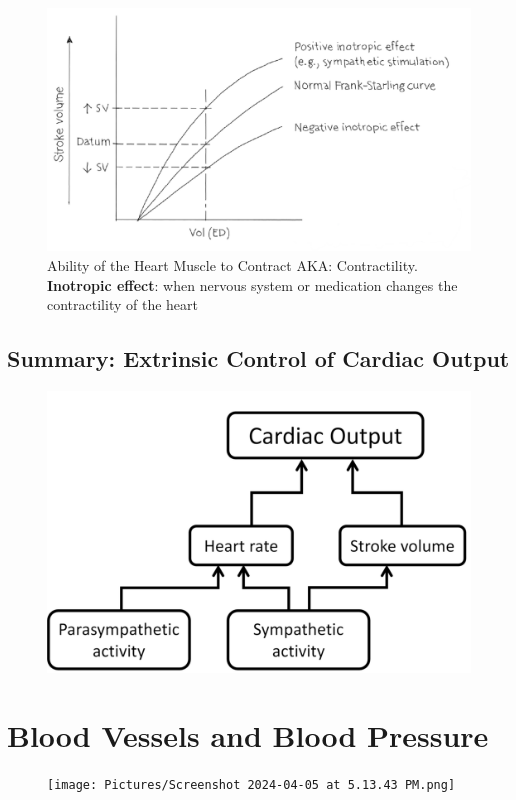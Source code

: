 \documentclass[11pt,fleqn]{book}
\begin{document}
\begin{figure}[h!]
\begin{center}
    \includegraphics[width=0.6\linewidth]{Pictures/Screenshot 2024-04-04 012911.png}
\end{center}
    \caption{Ability of the Heart Muscle to Contract
AKA: Contractility. \textbf{Inotropic effect}: when nervous
system or medication changes
the contractility of the heart
}
\end{figure}

\newpage
\subsection{Summary: Extrinsic Control of Cardiac Output}
\begin{figure}[h!]
\begin{center}
    \includegraphics[width=0.6\linewidth]{Pictures/Screenshot 2024-04-04 013127.png}
\end{center}
    \caption{}
\end{figure}

\section{Blood Vessels and Blood Pressure}
\begin{figure}[h!]
\begin{center}
    \texttt{[image: Pictures/Screenshot 2024-04-05 at 5.13.43 PM.png]}
\end{center}
    \caption{}
\end{figure}
\end{document}

